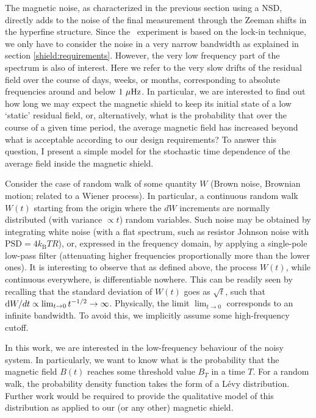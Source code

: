 The magnetic noise, as characterized in the previous section using a \gls{NSD},
directly adds to the noise of the final measurement through the Zeeman shifts in
the hyperfine structure. Since the \CENTREX\ experiment is based on the lock-in
technique, we only have to consider the noise in a very narrow bandwidth as
explained in section \ref{shield:requirements}. However, the very low frequency
part of the spectrum is also of interest. Here we refer to the very slow drifts
of the residual field over the course of days, weeks, or months, corresponding
to absolute frequencies around and below $1~\mathrm{\mu Hz}$. In particular, we are
interested to find out how long we may expect the magnetic shield to keep its
initial state of a low `static' residual field, or, alternatively, what is the
probability that over the course of a given time period, the average magnetic
field has increased beyond what is acceptable according to our design
requirements? To answer this question, I present a simple model for the
stochastic time dependence of the average field inside the magnetic shield.

Consider the case of random walk of some quantity $W$ (Brown noise, Brownian
motion; related to a Wiener process). In particular, a continuous random walk
$W(t)$ starting from the origin where the $dW$ increments are normally
distributed (with variance $\propto t$) random variables. Such noise may be
obtained by integrating white noise (with a flat spectrum, such as resistor
Johnson noise with $\text{PSD}=4k_\text{B} T R$), or, expressed in the frequency
domain, by applying a single-pole low-pass filter (attenuating higher
frequencies proportionally more than the lower ones).
%
It is interesting to observe that as defined above, the process $W(t)$, while
continuous everywhere, is differentiable nowhere. This can be readily seen by
recalling that the standard deviation of $W(t)$ goes as $\sqrt{t}$, such that
$\mathrm{d} W/dt\propto\lim_{t\to0}t^{-1/2}\to\infty$. Physically, the limit
$\lim_{t\to0}$ corresponds to an infinite bandwidth. To avoid this, we
implicitly assume some high-frequency cutoff.

In this work, we are interested in the low-frequency behaviour of the noisy
system. In particularly, we want to know what is the probability that the
magnetic field $B(t)$ reaches some threshold value $B_T$ in a time $T$. For a
random walk, the probability density function takes the form of a L\'evy
distribution. \cite{jacobs2010stochastic} Further work would be required to
provide the qualitative model of this distribution as applied to our (or any
other) magnetic shield.

